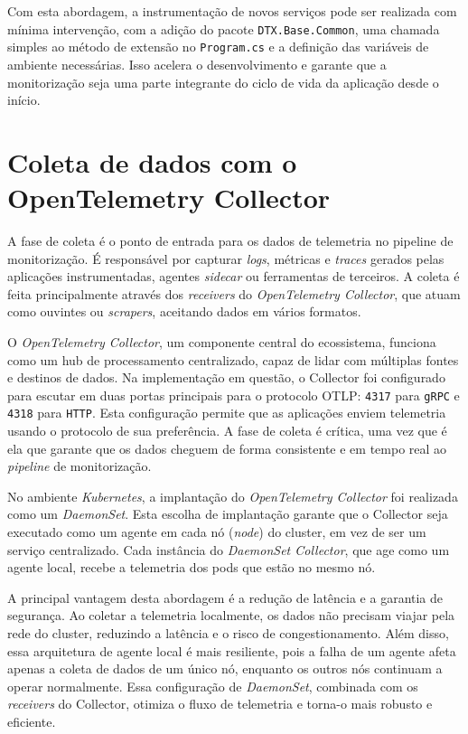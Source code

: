 Com esta abordagem, a instrumentação de novos serviços pode ser realizada com mínima intervenção, com a adição do pacote \texttt{DTX.Base.Common}, uma chamada simples ao método de extensão no \texttt{Program.cs} e a definição das variáveis de ambiente necessárias. Isso acelera o desenvolvimento e garante que a monitorização seja uma parte integrante do ciclo de vida da aplicação desde o início.


\section{Coleta de dados com o OpenTelemetry Collector}

A fase de coleta é o ponto de entrada para os dados de telemetria no pipeline de monitorização. É responsável por capturar \textit{logs}, métricas e \textit{traces} gerados pelas aplicações instrumentadas, agentes \textit{sidecar} ou ferramentas de terceiros. A coleta é feita principalmente através dos \textit{receivers} do \textit{OpenTelemetry Collector}, que atuam como ouvintes ou \textit{scrapers}, aceitando dados em vários formatos.

O \textit{OpenTelemetry Collector}, um componente central do ecossistema, funciona como um hub de processamento centralizado, capaz de lidar com múltiplas fontes e destinos de dados. Na implementação em questão, o Collector foi configurado para escutar em duas portas principais para o protocolo OTLP: \texttt{4317} para \texttt{gRPC} e \texttt{4318} para \texttt{HTTP}. Esta configuração permite que as aplicações enviem telemetria usando o protocolo de sua preferência. A fase de coleta é crítica, uma vez que é ela que garante que os dados cheguem de forma consistente e em tempo real ao \textit{pipeline} de monitorização.

No ambiente \textit{Kubernetes}, a implantação do \textit{OpenTelemetry Collector} foi realizada como um \textit{DaemonSet}. Esta escolha de implantação garante que o Collector seja executado como um agente em cada nó (\textit{node}) do cluster, em vez de ser um serviço centralizado. Cada instância do \textit{DaemonSet Collector}, que age como um agente local, recebe a telemetria dos pods que estão no mesmo nó.

A principal vantagem desta abordagem é a redução de latência e a garantia de segurança. Ao coletar a telemetria localmente, os dados não precisam viajar pela rede do cluster, reduzindo a latência e o risco de congestionamento. Além disso, essa arquitetura de agente local é mais resiliente, pois a falha de um agente afeta apenas a coleta de dados de um único nó, enquanto os outros nós continuam a operar normalmente. Essa configuração de \textit{DaemonSet}, combinada com os \textit{receivers} do Collector, otimiza o fluxo de telemetria e torna-o mais robusto e eficiente.

